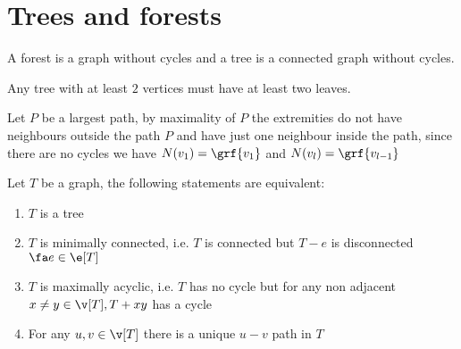 \chapter{Trees and forests}
A forest is a graph without cycles and a tree is a connected graph without cycles.
\begin{customlemma}{1.14}
    \label{lemma:1.14}
    Any tree with at least $2$ vertices must have at least two leaves.
\end{customlemma}
\begin{prf}
    Let $P$ be a largest path, by maximality of $P$ the extremities do not have neighbours outside the path $P$ and have just one neighbour inside the path, since there are no cycles we have $N(v_1) = \grf{v_1}$ and $N(v_l) = \grf{v_{l - 1}}$
\end{prf}
\begin{customtheorem}{1.15}
    \label{theorem:1.15}
    Let $T$ be a graph, the following statements are equivalent:
    \begin{enumerate}
        \item $T$ is a tree
        \item $T$ is minimally connected, i.e. $T$ is connected but $T - e$ is disconnected $\fa e \in \e[T]$
        \item $T$ is maximally acyclic, i.e. $T$ has no cycle but for any non adjacent $x \neq y \in \v[T], T + xy$ has a cycle
        \item For any $u, v \in \v[T]$ there is a unique $u - v$ path in $T$
    \end{enumerate}
\end{customtheorem}
